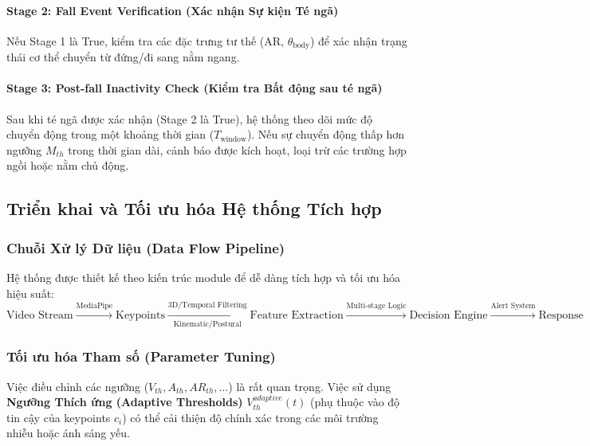\paragraph{Stage 2: Fall Event Verification (Xác nhận Sự kiện Té ngã)}
Nếu Stage 1 là True, kiểm tra các đặc trưng tư thế (AR, $\theta_{\text{body}}$) để xác nhận trạng thái cơ thể chuyển từ đứng/đi sang nằm ngang.

\paragraph{Stage 3: Post-fall Inactivity Check (Kiểm tra Bất động sau té ngã)}
Sau khi té ngã được xác nhận (Stage 2 là True), hệ thống theo dõi mức độ chuyển động trong một khoảng thời gian ($T_{\text{window}}$). Nếu sự chuyển động thấp hơn ngưỡng $M_{th}$ trong thời gian dài, cảnh báo được kích hoạt, loại trừ các trường hợp ngồi hoặc nằm chủ động.

\subsection{Triển khai và Tối ưu hóa Hệ thống Tích hợp}

\subsubsection{Chuỗi Xử lý Dữ liệu (Data Flow Pipeline)}
Hệ thống được thiết kế theo kiến trúc module để dễ dàng tích hợp và tối ưu hóa hiệu suất:
\begin{equation}
\text{Video Stream} \xrightarrow{\text{MediaPipe}} \text{Keypoints} 
\xrightarrow[\text{Kinematic/Postural}]{3\text{D/Temporal Filtering}} \text{Feature Extraction} 
\xrightarrow{\text{Multi-stage Logic}} \text{Decision Engine} 
\xrightarrow{\text{Alert System}} \text{Response}
\end{equation}

\subsubsection{Tối ưu hóa Tham số (Parameter Tuning)}
Việc điều chỉnh các ngưỡng ($V_{th}, A_{th}, AR_{th}, \dots$) là rất quan trọng. Việc sử dụng \textbf{Ngưỡng Thích ứng (Adaptive Thresholds)} $V_{th}^{adaptive}(t)$ (phụ thuộc vào độ tin cậy của keypoints $c_i$) có thể cải thiện độ chính xác trong các môi trường nhiễu hoặc ánh sáng yếu.
